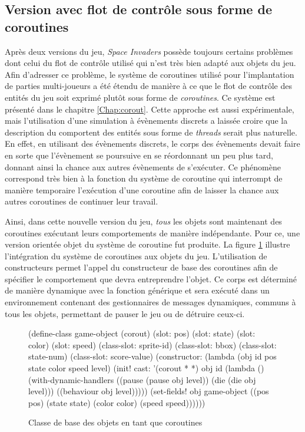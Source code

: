 \documentclass[12pt,twoside,letterpaper,francais]{book}
\newcommand{\scheme}[1]{\selectlanguage{english}{\tt #1}\selectlanguage{french}}
\begin{document}
\FloatBarrier
\subsection{Version avec flot de contrôle sous forme de coroutines} \label{Exp:sp3}
Après deux versions du jeu, \textit{Space Invaders} possède toujours
certains problèmes dont celui du flot de contrôle utilisé qui n'est
très bien adapté aux objets du jeu. Afin d'adresser ce problème, le
système de coroutines utilisé pour l'implantation de parties
multi-joueurs a été étendu de manière à ce que le flot de contrôle des
entités du jeu soit exprimé plutôt sous forme de \emph{coroutines}. Ce
système est présenté dans le chapitre \ref{Chap:corout}. Cette
approche est aussi expérimentale, mais l'utilisation d'une simulation
à évènements discrets a laissée croire que la description du
comportent des entités sous forme de \textit{threads} serait plus
naturelle. En effet, en utilisant des évènements discrets, le corps
des évènements devait faire en sorte que l'évènement se poursuive en
se réordonnant un peu plus tard, donnant ainsi la chance aux autres
évènements de s'exécuter. Ce phénomène correspond très bien à la
fonction \scheme{yield} du système de coroutine qui interrompt de
manière temporaire l'exécution d'une coroutine afin de laisser la
chance aux autres coroutines de continuer leur travail.

Ainsi, dans cette nouvelle version du jeu, \emph{tous} les objets sont
maintenant des coroutines exécutant leurs comportements de manière
indépendante. Pour ce, une version orientée objet du système de
coroutine fut produite. La figure \ref{Exp:si3-class} illustre
l'intégration du système de coroutines aux objets du
jeu. L'utilisation de constructeurs permet l'appel du constructeur de
base des coroutines afin de spécifier le comportement que devra
entreprendre l'objet. Ce corps est déterminé de manière dynamique avec
la fonction générique \scheme{behaviour} et sera exécuté dans un
environnement contenant des gestionnaires de messages dynamiques,
communs à tous les objets, permettant de pauser le jeu ou de détruire
ceux-ci.\\

\begin{figure}[htb!]
  \begin{schemecode}
(define-class game-object (corout)
  (slot: pos)
  (slot: state)
  (slot: color)
  (slot: speed)
  (class-slot: sprite-id)
  (class-slot: bbox)
  (class-slot: state-num)
  (class-slot: score-value)
  (constructor: (lambda (obj id pos state color speed level)
                  (init! cast: '(corout * *) obj id
                         (lambda ()(with-dynamic-handlers
                                    ((pause (pause obj level))
                                     (die   (die   obj level)))
                                    ((behaviour obj level)))))
                  (set-fields! obj game-object
                    ((pos pos)     (state state)
                     (color color) (speed speed))))))
  \end{schemecode}
  \caption{Classe de base des objets en tant que coroutines}
  \label{Exp:si3-class}
\end{figure}
\end{document}
